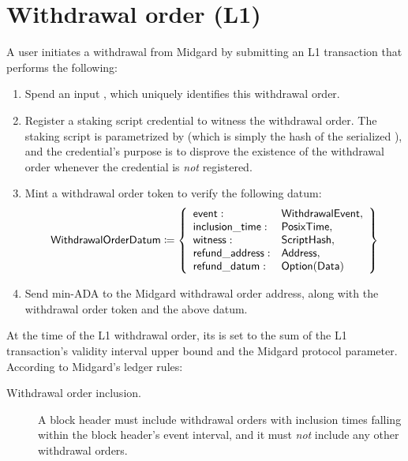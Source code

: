 \documentclass[../midgard.tex]{subfiles}
\begin{document}
\section{Withdrawal order (L1)}
\label{h:withdrawal-order}

A user initiates a withdrawal from Midgard by submitting an L1 transaction that performs the following:
\begin{enumerate}
    \item Spend an input , which uniquely identifies this withdrawal order.
    \item Register a staking script credential to witness the withdrawal order.
      The staking script is parametrized by  (which is simply the hash of the serialized ), and the credential's purpose is to disprove the existence of the withdrawal order whenever the credential is \emph{not} registered.
    \item Mint a withdrawal order token to verify the following datum:
        \begin{equation*}
        \mathsf{WithdrawalOrderDatum} \coloneq \left\{
            \begin{array}{ll}
                \mathsf{event} : & \mathsf{WithdrawalEvent}, \\
                \mathsf{inclusion\_time} : & \mathsf{PosixTime}, \\
                \mathsf{witness} : & \mathsf{ScriptHash}, \\
                \mathsf{refund\_address}: & \mathsf{Address}, \\
                \mathsf{refund\_datum}: & \mathsf{Option(Data)}
            \end{array}
            \right\}
        \end{equation*}
    \item Send min-ADA to the Midgard withdrawal order address, along with the withdrawal order token and the above datum.
\end{enumerate}

At the time of the L1 withdrawal order, its  is set to the sum of the L1 transaction's validity interval upper bound and the  Midgard protocol parameter.
According to Midgard's ledger rules:
\begin{description}
    \item[Withdrawal order inclusion.] A block header must include withdrawal orders with inclusion times falling within the block header's event interval, and it must \emph{not} include any other withdrawal orders.
\end{description}
\end{document}
